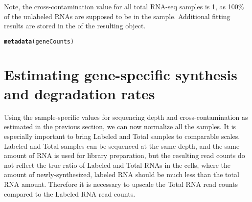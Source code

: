 \documentclass{article}\usepackage[]{graphicx}\usepackage[usenames,dvipsnames]{color}
\makeatletter
\newcommand{\hlstd}[1]{\textcolor[rgb]{0.345,0.345,0.345}{#1}}%
\newcommand{\hlkwd}[1]{\textcolor[rgb]{0.737,0.353,0.396}{\textbf{#1}}}%
\newenvironment{kframe}{%
 \def\at@end@of@kframe{}%
 \ifinner\ifhmode%
  \def\at@end@of@kframe{\end{minipage}}%
  \begin{minipage}{\columnwidth}%
 \fi\fi%
 \def\FrameCommand##1{\hskip\@totalleftmargin \hskip-\fboxsep
 \colorbox{shadecolor}{##1}\hskip-\fboxsep
     \hskip-\linewidth \hskip-\@totalleftmargin \hskip\columnwidth}%
 \MakeFramed {\advance\hsize-\width
   \@totalleftmargin\z@ \linewidth\hsize
   \@setminipage}}%
 {\par\unskip\endMakeFramed%
 \at@end@of@kframe}
\newenvironment{knitrout}{}{} %
\makeatother
\begin{document}
Note, the cross-contamination value for all total RNA-seq samples is 1, as 100\%
of the unlabeled RNAs are supposed to be in the sample.
Additional fitting results are stored in the  of the resulting
 object.
\begin{knitrout}
\color{fgcolor}\begin{kframe}
\begin{alltt}
\hlkwd{metadata}\hlstd{(geneCounts)}
\end{alltt}
\end{kframe}
\end{knitrout}



\newpage


\section{Estimating gene-specific synthesis and degradation rates} \label{SynDec}


Using the sample-specific values for sequencing depth and cross-contamination as estimated in the previous section, we can now normalize all the samples. It is especially important to bring Labeled and Total samples to comparable scales. Labeled and Total samples can be sequenced at the same depth, and the same amount of RNA is used for library preparation, but the resulting read counts do not reflect the true ratio of Labeled and Total RNAs in the cells, where the amount of newly-synthesized, labeled RNA should be much less than the total RNA amount. Therefore it is necessary to upscale the Total RNA read counts compared to the Labeled RNA read counts.
\end{document}
